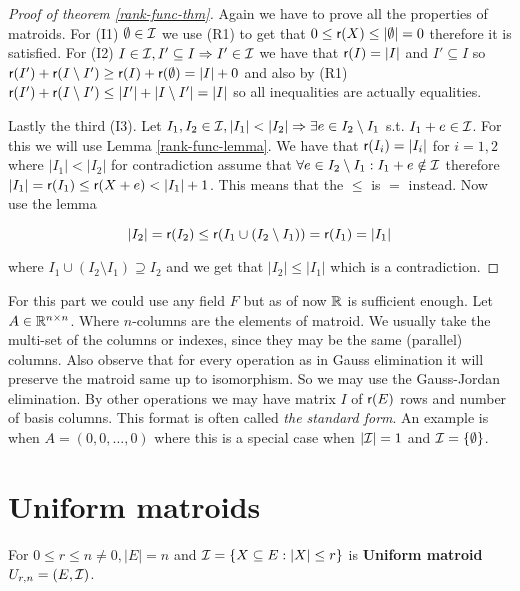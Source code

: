 \begin{proof}[Proof of theorem \ref{rank-func-thm}]
	Again we have to prove all the properties of matroids. For (I1) $\emptyset \in \mathcal{I}$ we use (R1) to get that $0 \leq \operatorname{\textsf{r}} (X) \leq |\emptyset| = 0$ therefore it is satisfied. For (I2) $I \in \mathcal{I}, I' \subseteq I \Rightarrow I' \in \mathcal{I}$ we have that $\operatorname{\textsf{r}}(I) = |I|$ and $I' \subseteq  I$ so $\operatorname{\textsf{r}}(I') + \operatorname{\textsf{r}}(I \setminus I') \geq \operatorname{\textsf{r}}(I) + \operatorname{\textsf{r}}(\emptyset) = |I| + 0$ and also by (R1) $\operatorname{\textsf{r}}(I') + \operatorname{\textsf{r}}(I \setminus I') \leq |I'| + |I \setminus I'| = |I|$ so all inequalities are actually equalities.
	
	Lastly the third (I3). Let $I_1, I_2 \in \mathcal{I}, |I_1| < |I_2| \Rightarrow \exists e \in I_2 \setminus I_1$ s.t. $I_1 + e \in \mathcal{I}$. For this we will use Lemma \ref{rank-func-lemma}. We have that $\operatorname{\textsf{r}}(I_i) = |I_i|$ for $i=1,2$ where $|I_1| < |I_2|$ for contradiction assume that $\forall e \in I_2 \setminus I_1 : I_1 + e \notin \mathcal{I}$ therefore $|I_1| = \operatorname{\textsf{r}}(I_1) \leq \operatorname{\textsf{r}}(X+e) < |I_1| + 1$. This means that the $\leq$ is $=$ instead. Now use the lemma
	
	$$
	|I_2| = \operatorname{\textsf{r}}(I_2) \leq \operatorname{\textsf{r}}(I_1 \cup (I_2 \setminus I_1)) = \operatorname{\textsf{r}}(I_1) = |I_1|
	$$
	
	\noindent where $I_1 \cup (I_2 \setminus I_1) \supseteq I_2$ and we get that $|I_2| \leq |I_1|$ which is a contradiction.
\end{proof}

For this part we could use any field $F$ but as of now $\mathbb{R}$ is sufficient enough. Let $A \in \mathbb{R}^{n \times n}$. Where $n$-columns are the elements of matroid. We usually take the multi-set of the columns or indexes, since they may be the same (parallel) columns. Also observe that for every operation as in Gauss elimination it will preserve the matroid same up to isomorphism. So we may use the Gauss-Jordan elimination. By other operations we may have matrix $I$ of $\operatorname{\textsf{r}}(E)$ rows and number of basis columns. This format is often called \textit{the standard form}. An example is when $A = (0, 0, \dots, 0)$ where this is a special case when $|\mathcal{I}| = 1$ and $\mathcal{I} = \{\emptyset\}$.

\section{Uniform matroids}

\begin{defn}
	For $0 \leq r \leq n \neq 0, |E| = n$ and $\mathcal{I} = \{X \subseteq E : |X| \leq r\}$ is \textbf{Uniform matroid} $U_{r,n} = (E, \mathcal{I})$.
\end{defn}

